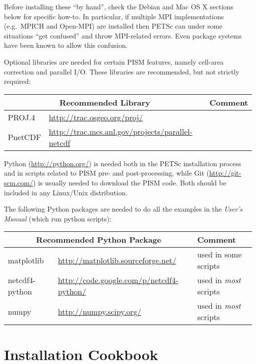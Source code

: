 \documentclass[titlepage,letterpaper,final]{scrartcl}
\begin{document}
Before installing these ``by hand'', check the Debian and Mac OS X sections below for specific how-to.  In particular, if multiple MPI implementations (e.g.~MPICH and Open-MPI) are installed then PETSc can under some situations ``get confused'' and throw MPI-related errors.  Even package systems have been known to allow this confusion.

Optional libraries are needed for certain PISM features, namely cell-area correction and parallel I/O.  These libraries are recommended, but not strictly required: \bigskip

\begin{center}
  \begin{tabular}{lll}
    \toprule
    \multicolumn{2}{c}{\textbf{Recommended Library}} & \textbf{Comment}\\
    \midrule
    PROJ.4 & \url{http://trac.osgeo.org/proj/} & \\
    PnetCDF & \url{http://trac.mcs.anl.gov/projects/parallel-netcdf} & \\
   \bottomrule
  \end{tabular}
\end{center}

\bigskip

Python (\url{http://python.org/}) is needed both in the PETSc installation process and in scripts related to PISM pre- and post-processing, while Git (\url{http://git-scm.com/}) is usually needed to download the PISM code.  Both should be included in any Linux/Unix distribution.

The following Python packages are needed to do all the examples in the \emph{User's Manual} (which run python scripts):
\bigskip

\begin{center}
  \begin{tabular}{lll}
    \toprule
    \multicolumn{2}{c}{\textbf{Recommended Python Package}} & \textbf{Comment}\\
    \midrule
    matplotlib & \url{http://matplotlib.sourceforge.net/} & used in some scripts \\
    netcdf4-python & \url{http://code.google.com/p/netcdf4-python/} & used in \emph{most} scripts \\
    numpy & \url{http://numpy.scipy.org/} & used in \emph{most} scripts \\
   \bottomrule
  \end{tabular}
\end{center}


\section{Installation Cookbook}\label{sec:cookbook}
\end{document}
